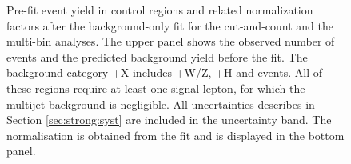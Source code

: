 \begin{figure}[htbp]
	\centering
	\caption{Pre-fit event yield in control regions and related \ttbar
          normalization factors after the background-only fit for
		the cut-and-count and  the multi-bin analyses. The upper panel shows 
		the observed number of events and the predicted background yield before the fit.
		The background category \ttbar+X includes \ttbar+W/Z, \ttbar+H and \ttbar\ttbar events. All of these
                regions require at least one signal lepton, for which the
                multijet background is negligible. All uncertainties describes in Section \ref{sec:strong:syst} are included in the uncertainty band.
		The \ttbar normalisation is obtained from the fit
                and is displayed in the bottom panel. 
	} 
	\label{fig:pullCR}
\end{figure}


